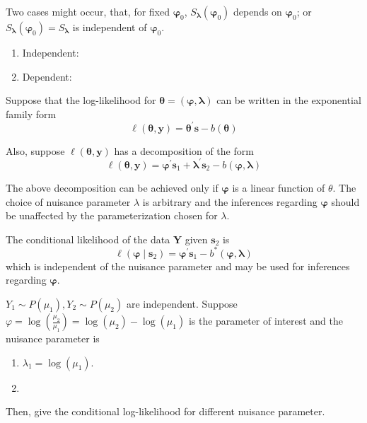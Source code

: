 \begin{remark}
    Two cases might occur, that, for fixed $\boldsymbol{\varphi}_{0}$, $S_{\boldsymbol{\lambda}}\left(\boldsymbol{\varphi}_{0}\right)$ depends on $\boldsymbol{\varphi}_{0}$; or $S_{\boldsymbol{\lambda}}\left(\boldsymbol{\varphi}_{0}\right)=S_{\boldsymbol{\lambda}}$ is independent of $\boldsymbol{\varphi}_{0}$.
    \begin{enumerate}
        \item Independent:
        \item Dependent:
    \end{enumerate}
\end{remark}

Suppose that the log-likelihood for $\boldsymbol{\theta}=\left(\boldsymbol{\varphi},\boldsymbol{\lambda}\right)$ can be written in the exponential family form
\begin{equation}
    \ell\left(\boldsymbol{\theta},\mathbf{y}\right)=\boldsymbol{\theta}^{\prime}\mathbf{s}-b\left(\boldsymbol{\theta}\right)
\end{equation}

Also, suppose $\ell\left(\boldsymbol{\theta},\mathbf{y}\right)$ has a decomposition of the form
\begin{equation}
    \ell\left(\boldsymbol{\theta},\mathbf{y}\right)=\boldsymbol{\varphi}^{\prime}\mathbf{s}_{1}+\boldsymbol{\lambda}^{\prime}\mathbf{s}_{2}-b(\boldsymbol{\varphi},\boldsymbol{\lambda})
\end{equation}

\begin{remark}
    The above decomposition can be achieved only if $\boldsymbol{\varphi}$ is a linear function of $\theta$. The choice of nuisance parameter $\lambda$ is arbitrary and the inferences regarding $\boldsymbol{\varphi}$ should be unaffected by the parameterization chosen for $\lambda$.
\end{remark}

The conditional likelihood of the data $\mathbf{Y}$ given $\mathbf{s}_{2}$ is
\begin{equation}
    \ell\left(\boldsymbol{\varphi}\mid\mathbf{s}_{2}\right)=\boldsymbol{\varphi}^{\prime}\mathbf{s}_{1}-b^{*}\left(\boldsymbol{\varphi},\boldsymbol{\lambda}\right)
\end{equation}
which is independent of the nuisance parameter and may be used for inferences regarding $\boldsymbol{\varphi}$.

\begin{example}
    $Y_{1}\sim P\left(\mu_{1}\right),Y_{2}\sim P\left(\mu_{2}\right)$ are independent. Suppose $\varphi=\log\left(\frac{\mu_{2}}{\mu_{1}}\right)=\log\left(\mu_{2}\right)-\log\left(\mu_{1}\right)$ is the parameter of interest and the nuisance parameter is
    \begin{enumerate}
        \item $\lambda_{1}=\log\left(\mu_{1}\right)$.
        \item
    \end{enumerate}
    Then, give the conditional log-likelihood for different nuisance parameter.
\end{example}

